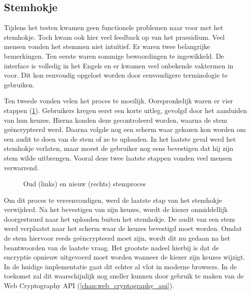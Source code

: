 \subsection{Stemhokje}
\label{sec:kv:stemhokje}

Tijdens het testen kwamen geen functionele problemen naar voor met het stemhokje. Toch kwam ook hier veel feedback op van het praesidium. Veel mensen vonden het stemmen niet intu\"itief. Er waren twee belangrijke bemerkingen. Ten eerste waren sommige bewoordingen te ingewikkeld. De interface is volledig in het Engels en er kwamen veel onbekende vaktermen in voor. Dit kon eenvoudig opgelost worden door eenvoudigere terminologie te gebruiken.

\npar Ten tweede vonden velen het proces te moeilijk. Oorspronkelijk waren er vier stappen (\ref{fig:kv:voting_booth_flows}). Gebruikers kregen eerst een korte uitleg, gevolgd door het aanduiden van hun keuzes. Hierna konden deze gecontroleerd worden, waarna de stem ge\"encrypteerd werd. Daarna volgde nog een scherm waar gekozen kon worden om een audit te doen van de stem of ze te uploaden. In het laatste geval werd het stemhokje verlaten, maar moest de gebruiker nog eens bevestigen dat hij zijn stem wilde uitbrengen. Vooral deze twee laatste stappen vonden veel mensen verwarrend.

\begin{figure}
  \centering
  \begin{minipage}{.45\linewidth}
    \centering
    \scalebox{.7}{}
  \end{minipage}
  \quad
  \begin{minipage}{.45\linewidth}
    \centering
    \scalebox{.7}{}
  \end{minipage}
  \caption{Oud (links) en nieuw (rechts) stemproces}
  \label{fig:kv:voting_booth_flows}
\end{figure}

\npar Om dit proces te vereenvoudigen, werd de laatste stap van het stemhokje verwijderd. Na het bevestigen van zijn keuzes, wordt de kiezer onmiddellijk doorgestuurd naar het uploaden buiten het stemhokje. De audit van een stem werd verplaatst naar het scherm waar de keuzes bevestigd moet worden. Omdat de stem hiervoor reeds ge\"encrypteerd moet zijn, wordt dit nu gedaan na het beantwoorden van de laatste vraag. Het grootste nadeel hierbij is dat de encryptie opnieuw uitgevoerd moet worden wanneer de kiezer zijn keuzes wijzigt. In de huidige implementatie gaat dit echter al vlot in moderne browsers. In de toekomst zal dit waarschijnlijk nog sneller kunnen door gebruik te maken van de Web Cryptography API (\ref{chap:web_cryptography_api}).

